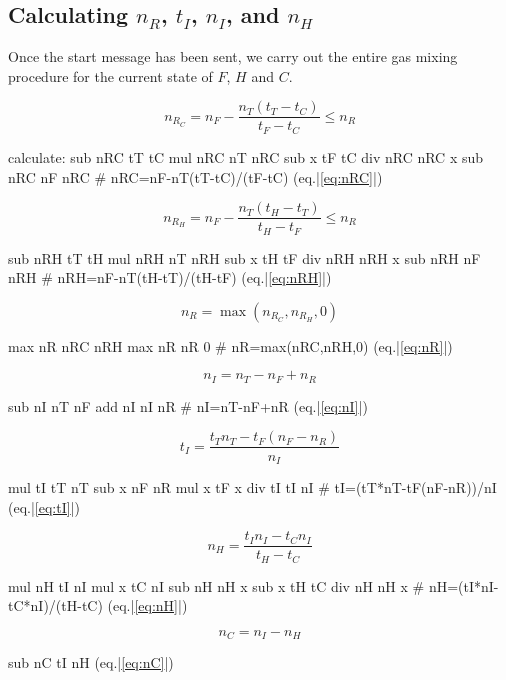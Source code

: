 \documentclass{article}
\begin{document}
\subsection{%
    Calculating \texorpdfstring{$n_R$}{nR}, \texorpdfstring{$t_I$}{tI},
    \texorpdfstring{$n_I$}{nI}, and \texorpdfstring{$n_H$}{nH}
}

Once the start message has been sent, we carry out the entire
gas mixing procedure for the current state of $F$, $H$ and $C$.
\vspace{1em}
\begin{paracol}{2}
    \noindent
    \[
        n_{R_C} = n_F-\frac{n_T(t_T-t_C)}{t_F-t_C} \le n_R
    \]
    \switchcolumn
    \begin{mips}
        calculate:
        sub nRC tT tC
        mul nRC nT nRC
        sub x tF tC
        div nRC nRC x
        sub nRC nF nRC # nRC=nF-nT(tT-tC)/(tF-tC) (eq.|\ref{eq:nRC}|)
    \end{mips}
    \switchcolumn*
    \noindent
    \[
        n_{R_H} = n_F-\frac{n_T(t_H-t_T)}{t_H-t_F} \le n_R
    \]
    \switchcolumn
    \begin{mips}
        sub nRH tT tH
        mul nRH nT nRH
        sub x tH tF
        div nRH nRH x
        sub nRH nF nRH # nRH=nF-nT(tH-tT)/(tH-tF) (eq.|\ref{eq:nRH}|)
    \end{mips}
    \switchcolumn*
    \noindent
    \[
        n_R = \max(n_{R_C},n_{R_H},0)
    \]
    \switchcolumn
    \begin{mips}
        max nR nRC nRH
        max nR nR 0 # nR=max(nRC,nRH,0) (eq.|\ref{eq:nR}|)
    \end{mips}
    \switchcolumn*
    \noindent
    \[
        n_I = n_T-n_F+n_R
    \]
    \switchcolumn
    \begin{mips}
        sub nI nT nF
        add nI nI nR # nI=nT-nF+nR (eq.|\ref{eq:nI}|)
    \end{mips}
    \switchcolumn*
    \noindent
    \[
        t_I = \frac{t_T n_T-t_F(n_F-n_R)}{n_I}
    \]
    \switchcolumn
    \begin{mips}
        mul tI tT nT
        sub x nF nR
        mul x tF x
        div tI tI nI # tI=(tT*nT-tF(nF-nR))/nI (eq.|\ref{eq:tI}|)
    \end{mips}
    \switchcolumn*
    \noindent
    \[
        n_H = \frac{t_I n_I-t_C n_I}{t_H-t_C}
    \]
    \switchcolumn
    \begin{mips}
        mul nH tI nI
        mul x tC nI
        sub nH nH x
        sub x tH tC
        div nH nH x # nH=(tI*nI-tC*nI)/(tH-tC) (eq.|\ref{eq:nH}|)
    \end{mips}
    \switchcolumn*
    \noindent
    \[
        n_C = n_I-n_H
    \]
    \switchcolumn
    \begin{mips}
        sub nC tI nH (eq.|\ref{eq:nC}|)
    \end{mips}
\end{paracol}
\end{document}
